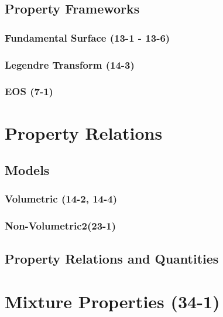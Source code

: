 \documentclass{mitqualif}
\begin{document}




\subsection{Property Frameworks}
\subsubsection{Fundamental Surface (13-1 - 13-6)}






\subsubsection{Legendre Transform (14-3)}

\subsubsection{EOS (7-1)}

\section{Property Relations}
\subsection{Models}
\subsubsection{Volumetric (14-2, 14-4)}






\subsubsection{Non-Volumetric2(23-1)}


\subsection{Property Relations and Quantities}
\section{Mixture Properties (34-1)}


\end{document}

